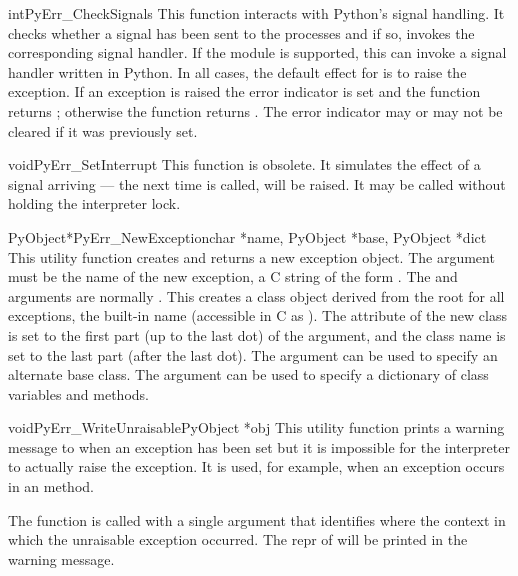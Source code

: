 \documentclass{manual}
\begin{document}
\begin{cfuncdesc}{int}{PyErr_CheckSignals}{}
This function interacts with Python's signal handling.  It checks
whether a signal has been sent to the processes and if so, invokes the
corresponding signal handler.  If the
 module is supported, this can
invoke a signal handler written in Python.  In all cases, the default
effect for  is to raise the
 exception.  If an exception is raised the 
error indicator is set and the function returns ; otherwise
the function returns .  The error indicator may or may not be
cleared if it was previously set.
\end{cfuncdesc}

\begin{cfuncdesc}{void}{PyErr_SetInterrupt}{}
This function is obsolete.  It simulates the effect of a
 signal arriving --- the next time
 is called,
 will be raised.
It may be called without holding the interpreter lock.
\end{cfuncdesc}

\begin{cfuncdesc}{PyObject*}{PyErr_NewException}{char *name,
                                                 PyObject *base,
                                                 PyObject *dict}
This utility function creates and returns a new exception object.  The
 argument must be the name of the new exception, a C string
of the form .  The  and
 arguments are normally \NULL{}.  This creates a
class object derived from the root for all exceptions, the built-in
name  (accessible in C as
).  The  attribute of the
new class is set to the first part (up to the last dot) of the
 argument, and the class name is set to the last part (after
the last dot).  The  argument can be used to specify an
alternate base class.  The  argument can be used to specify
a dictionary of class variables and methods.
\end{cfuncdesc}

\begin{cfuncdesc}{void}{PyErr_WriteUnraisable}{PyObject *obj}
This utility function prints a warning message to 
when an exception has been set but it is impossible for the
interpreter to actually raise the exception.  It is used, for example,
when an exception occurs in an  method.

The function is called with a single argument  that
identifies where the context in which the unraisable exception
occurred.  The repr of  will be printed in the warning
message.
\end{cfuncdesc}
\end{document}
